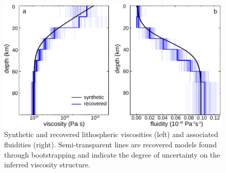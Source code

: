 \begin{figure}\label{figure4}
  \includegraphics{ch2/figures/Fig4.pdf}
  \caption{Synthetic and recovered lithospheric viscosities (left)
    and associated fluidities (right).  Semi-transparent lines are recovered
    models found through bootstrapping and indicate the degree of
    uncertainty on the inferred viscosity structure.}
\end{figure}

